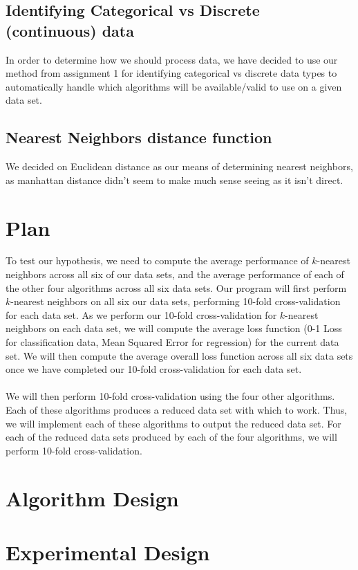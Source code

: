 \documentclass{article}
\begin{document}
\subsection*{Identifying Categorical vs Discrete (continuous) data}
\quad \quad In order to determine how we should process data, we have decided to use our method from assignment 1 for identifying categorical vs discrete data types to automatically handle which algorithms will be available/valid to use on a given data set.

\subsection*{Nearest Neighbors distance function}
\quad \quad We decided on Euclidean distance as our means of determining nearest neighbors, as manhattan distance didn’t seem to make much sense seeing as it isn’t direct. 

\section{Plan}
\quad \quad To test our hypothesis, we need to compute the average performance of $k$-nearest neighbors across all six of our data sets, and the average performance of each of the other four algorithms across all six data sets. Our program will first perform $k$-nearest neighbors on all six our data sets, performing 10-fold cross-validation for each data set. As we perform our 10-fold cross-validation for $k$-nearest neighbors on each data set, we will compute the average loss function (0-1 Loss for classification data, Mean Squared Error for regression) for the current data set. We will then compute the average overall loss function across all six data sets once we have completed our 10-fold cross-validation for each data set. \\ \\
\quad \quad We will then perform 10-fold cross-validation using the four other algorithms. Each of these algorithms produces a reduced data set with which to work. Thus, we will implement each of these algorithms to output the reduced data set. For each of the reduced data sets produced by each of the four algorithms, we will perform 10-fold cross-validation.

\section{Algorithm Design}

\section{Experimental Design}
\end{document}
